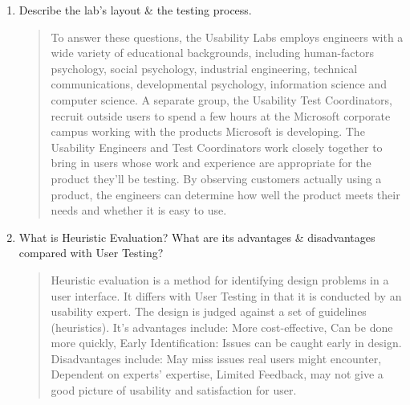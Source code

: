 \documentclass{article}
\begin{document}
\begin{enumerate}
    \item Describe the lab's layout \& the testing process.

    \begin{quote}
    To answer these questions, the Usability Labs employs engineers with a wide variety of educational backgrounds, including human-factors psychology, social psychology, industrial engineering, technical communications, developmental psychology, information science and computer science. A separate group, the Usability Test Coordinators, recruit outside users to spend a few hours at the Microsoft corporate campus working with the products Microsoft is developing. The Usability Engineers and Test Coordinators work closely together to bring in users whose work and experience are appropriate for the product they’ll be testing. By observing customers actually using a product, the engineers can determine how well the product meets their needs and whether it is easy to use.
    \end{quote}

    \item What is Heuristic Evaluation? What are its advantages \& disadvantages compared with User Testing?

    \begin{quote}
    Heuristic evaluation is a method for identifying design problems in a user interface. It differs with User Testing in that it is conducted by an usability expert. The design is judged against a set of guidelines (heuristics). It's advantages include: More cost-effective, Can be done more quickly, Early Identification: Issues can be caught early in design. Disadvantages include: May miss issues real users might encounter, Dependent on experts' expertise, Limited Feedback, may not give a good picture of usability and satisfaction for user.
    \end{quote}
\end{enumerate}
\end{document}
